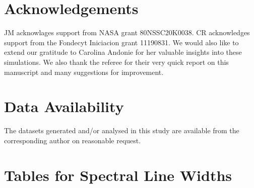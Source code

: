 \documentclass[fleqn,usenatbib]{mnras}
\begin{document}

\newpage












\section*{Acknowledgements}
JM acknowlages support from NASA grant 80NSSC20K0038. CR acknowledges support from the Fondecyt Iniciacion grant 11190831. We would also like to extend our gratitude to Carolina Andonie for her valuable insights into these simulations. We also thank the referee for their very quick report on this manuscript and many suggestions for improvement.

\section*{Data Availability}
The datasets generated and/or analysed in this study are available from the corresponding author
on reasonable request.

\appendix

\section{Tables for Spectral Line Widths}
\end{document}
